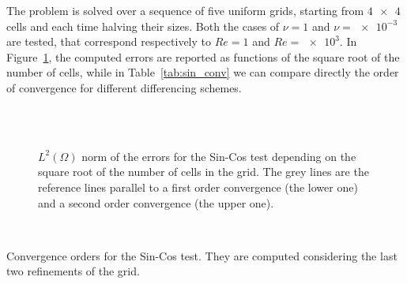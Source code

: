 The problem is solved over a sequence of five uniform grids, starting from 
$\num{4x4}$ cells and each time halving their sizes. Both the cases of $\nu=1$ 
and $\nu=\num{e-3}$ are tested, that correspond respectively to $Re=1$ and 
$Re=\num{e3}$. In Figure~\ref{fig:sin_err}, the computed errors are reported 
as functions of the square root of the number of cells, while in 
Table~\ref{tab:sin_conv} we can compare directly the 
order of convergence for different differencing schemes.
\begin{figure}
	\centering
	\subfloat[Upwind, $Re = 1$]{
		}
	\subfloat[Upwind, $Re = \num{e3}$]{
		}\\
	\subfloat[Min-Mod, $Re = 1$]{
		}
	\subfloat[Min-Mod, $Re = \num{e3}$]{
		}\\
	\subfloat[Van Leer, $Re = 1$]{
		}
	\subfloat[Van Leer, $Re = \num{e3}$]{
		\label{fig:sin_err_vl_hre}}
	\caption[$L^2(\Omega)$ norm of the errors for the Sin-Cos 
	test]{$L^2(\Omega)$ norm of the errors 
	for the Sin-Cos 
	test depending on the square root of the number of cells in the grid. 
	The grey lines are the reference lines parallel to a first order convergence (the lower one) and a
	second order convergence (the upper one).}
	\label{fig:sin_err}
\end{figure}

\begin{table}
	\centering
	\\
	\caption[Convergence orders for the Sin-Cos test]{Convergence orders for 
	the Sin-Cos test. They are computed considering the last two refinements of 
	the grid.}
	\label{tab:sin_conv}
\end{table}

